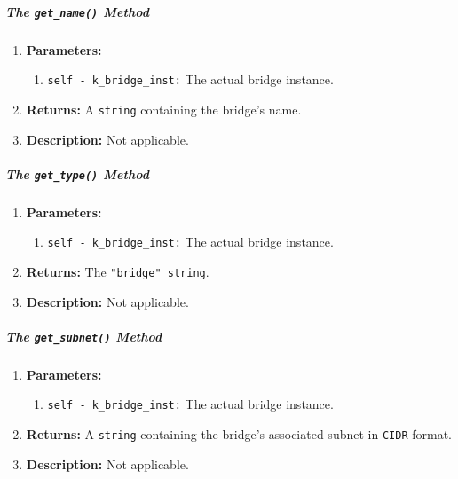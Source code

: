         \subparagraph{The \texttt{get\_name()} Method}
            \begin{enumerate}
                \item \textbf{Parameters:}
                \begin{enumerate}
                    \item \texttt{self - k\_bridge\_inst:} The actual bridge instance.
                \end{enumerate}
                \item \textbf{Returns:} A \texttt{string} containing the bridge's name.
                \item \textbf{Description:} Not applicable.
            \end{enumerate}

        \subparagraph{The \texttt{get\_type()} Method}
            \begin{enumerate}
                \item \textbf{Parameters:}
                \begin{enumerate}
                    \item \texttt{self - k\_bridge\_inst:} The actual bridge instance.
                \end{enumerate}
                \item \textbf{Returns:} The \texttt{"bridge" string}.
                \item \textbf{Description:} Not applicable.
            \end{enumerate}

        \subparagraph{The \texttt{get\_subnet()} Method}
            \begin{enumerate}
                \item \textbf{Parameters:}
                \begin{enumerate}
                    \item \texttt{self - k\_bridge\_inst:} The actual bridge instance.
                \end{enumerate}
                \item \textbf{Returns:} A \texttt{string} containing the bridge's associated subnet in \texttt{CIDR} format.
                \item \textbf{Description:} Not applicable.
            \end{enumerate}


